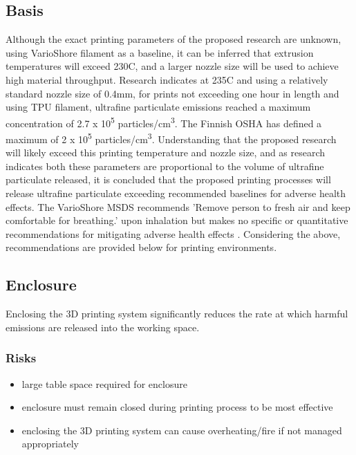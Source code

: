 \documentclass[11pt]{article}
\begin{document}
\subsection{Basis}
\label{sec:org6908163}
Although the exact printing parameters of the proposed research are unknown, using VarioShore filament as a baseline, it can be inferred that extrusion temperatures will exceed 230C, and a larger nozzle size will be used to achieve high material throughput. Research indicates at 235C and using a relatively standard nozzle size of 0.4mm, for prints not exceeding one hour in length and using TPU filament, ultrafine particulate emissions reached a maximum concentration of 2.7 x 10\textsuperscript{5} particles/cm\textsuperscript{3}. The Finnish OSHA has defined a maximum of 2 x 10\textsuperscript{5} particles/cm\textsuperscript{3}. Understanding that the proposed research will likely exceed this printing temperature and nozzle size, and as research indicates both these parameters are proportional to the volume of ultrafine particulate released, it is concluded that the proposed printing processes will release ultrafine particulate exceeding recommended baselines for adverse health effects. The VarioShore MSDS recommends 'Remove person to fresh air and keep comfortable for breathing.' upon inhalation but makes no specific or quantitative recommendations for mitigating adverse health effects . Considering the above, recommendations are provided below for printing environments.

\subsection{Enclosure}
\label{sec:org612efcf}
Enclosing the 3D printing system significantly reduces the rate at which harmful emissions are released into the working space.

\subsubsection{Risks}
\label{sec:org5817b7d}
\begin{itemize}
\item large table space required for enclosure
\item enclosure must remain closed during printing process to be most effective
\item enclosing the 3D printing system can cause overheating/fire if not managed appropriately
\end{itemize}
\end{document}
